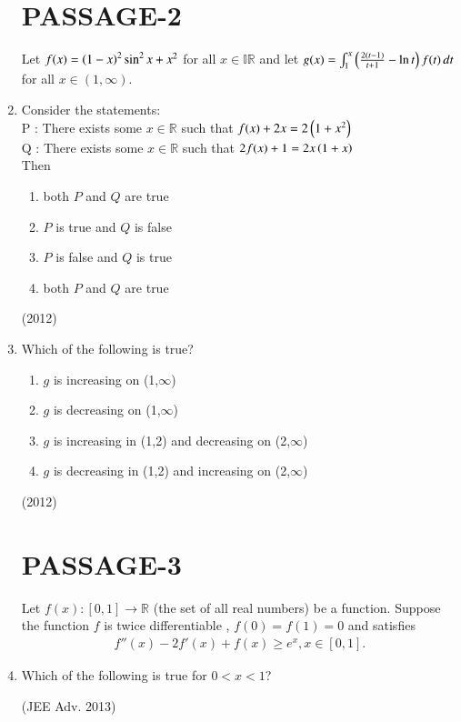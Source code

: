 \documentclass[journal,,12pt,twocolumn]{IEEEtran}
\theoremstyle{remark}
\begin{document}
\begin{enumerate}
\section*{PASSAGE-2}
Let $f(x)=\left(1-x\right)^2 \sin^2 x + x^2$ for all $x \in \mathbb{IR}$ and let $g(x)=
\int_{1}^{x} \left(\frac{2(t-1)}{t+1} - \ln t\right)  f(t) \, dt $ for all $x \in (1 ,\infty)$.
\item Consider the statements:\\
P : There exists some $x \in \mathbb{R}$ such that $f(x) + 2x = 2\left(1+x^2\right)$\\
Q : There exists some $x \in\mathbb{R}$ such that $2f(x) + 1 = 2x\left(1+x\right)$\\
    Then
\begin{enumerate}[label=\alph*)]
\item both $P$ and $Q$ are true
\item $P$ is true and $Q$ is false
\item $P$ is false and $Q$ is true
\item both $P$ and $Q$ are true
\end{enumerate}

\hfill{(2012)}



\item Which of the following is true?
\begin{enumerate}[label=\alph*)]
\item $g$ is increasing on (1,$\infty$)
\item $g$ is decreasing on (1,$\infty$)
\item $g$ is increasing in (1,2) and decreasing on (2,$\infty$)
\item $g$ is decreasing in (1,2) and increasing on (2,$\infty$)
\end{enumerate}
\hfill{(2012)}

\section*{PASSAGE-3}
Let $f(x) : [0,1] \to\mathbb{R}$
(the set of all real numbers) be a function. Suppose the function $f$ is twice differentiable , $f(0)=f(1)=0$ and satisfies \begin{align*} f''(x)-2f'(x)+f(x) \geq e^x , x \in [0,1].\end{align*} 

\item Which of the following is true for $0<x<1$?


\hfill{(JEE Adv. 2013)}


\end{enumerate}
\end{document}

